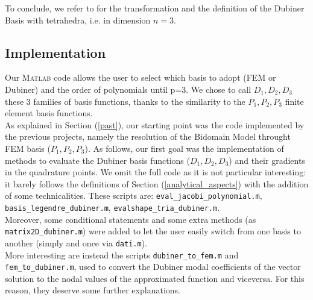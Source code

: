 \documentclass[a4paper,11pt]{article}
\begin{document}
    \noindent To conclude, we refer to \cite{sherwin} for the transformation and the definition of the Dubiner Basis with tetrahedra, i.e. in dimension $n=3$.
    
    \subsection{Implementation}\label{subsection_implementation}
    Our \textsc{Matlab} code allows the user to select which basis to adopt (FEM or Dubiner) and the order of polynomials until p=3. We chose to call $D_1,D_2,D_3$ these 3 families of basis functions, thanks to the similarity to the $P_1,P_2,P_3$ finite element basis functions.\\
    As explained in Section (\ref{past}), our starting point was the code implemented by the previous projects, namely the resolution of the Bidomain Model throught FEM basis ($P_1,P_2,P_3$). As follows, our first goal was the implementation of methods to evaluate the Dubiner basis functions ($D_1,D_2,D_3$) and their gradients in the quadrature points. We omit the full code as it is not particular interesting: it barely follows the definitions of Section (\ref{analytical_aspects}) with the addition of some technicalities. These scripts are: \texttt{eval\_jacobi\_polynomial.m}, \texttt{basis\_legendre\_dubiner.m}, \texttt{evalshape\_tria\_dubiner.m}.\\
    
    \noindent Moreover, some conditional statements and some extra methods (as \texttt{matrix2D\_dubiner.m}) were added to let the user easily switch from one basis to another (simply and once via \texttt{dati.m}). \\
    
    \noindent More interesting are instead the scripts \texttt{dubiner\_to\_fem.m} and \texttt{fem\_to\_dubiner.m}, used to convert the Dubiner modal coefficients of the vector solution to the nodal values of the approximated function and viceversa. For this reason, they deserve some further explanations.
\end{document}
